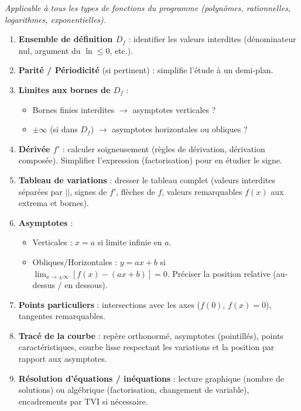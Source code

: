 \documentclass[11pt]{article}
\begin{document}
\begin{methode}
\emph{Applicable à tous les types de fonctions du programme (polynômes, rationnelles, logarithmes, exponentielles).}
\begin{enumerate}
\item \textbf{Ensemble de définition $D_f$} : identifier les valeurs interdites (dénominateur nul, argument du $\ln \le 0$, etc.).
\item \textbf{Parité / Périodicité} (si pertinent) : simplifie l'étude à un demi-plan.
\item \textbf{Limites aux bornes de $D_f$} : 
\begin{itemize}
\item Bornes finies interdites $\to$ asymptotes verticales ?
\item $\pm\infty$ (si dans $D_f$) $\to$ asymptotes horizontales ou obliques ?
\end{itemize}
\item \textbf{Dérivée $f'$} : calculer soigneusement (règles de dérivation, dérivation composée). Simplifier l'expression (factorisation) pour en étudier le signe.
\item \textbf{Tableau de variations} : dresser le tableau complet (valeurs interdites séparées par $||$, signes de $f'$, flèches de $f$, valeurs remarquables $f(x)$ aux extrema et bornes).
\item \textbf{Asymptotes} : 
\begin{itemize}
\item Verticales : $x = a$ si limite infinie en $a$.
\item Obliques/Horizontales : $y = ax+b$ si $\lim_{x\to\pm\infty}[f(x)-(ax+b)]=0$. Préciser la position relative (au-dessus / en dessous).
\end{itemize}
\item \textbf{Points particuliers} : intersections avec les axes ($f(0)$, $f(x)=0$), tangentes remarquables.
\item \textbf{Tracé de la courbe} : repère orthonormé, asymptotes (pointillés), points caractéristiques, courbe lisse respectant les variations et la position par rapport aux asymptotes.
\item \textbf{Résolution d'équations / inéquations} : lecture graphique (nombre de solutions) ou algébrique (factorisation, changement de variable), encadrements par TVI si nécessaire.
\end{enumerate}
\end{methode}
\end{document}
